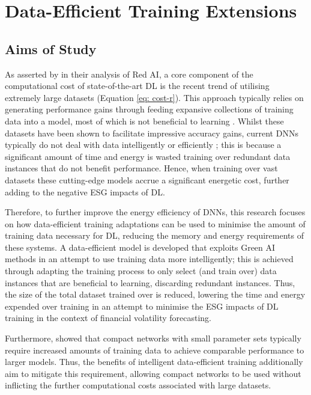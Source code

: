 \documentclass[a4paper, 11pt]{report}
\begin{document}
    \section{Data-Efficient Training Extensions}
    \label{section: data-extensions}

    \subsection{Aims of Study}

    As asserted by \citet{schwartz-2019} in their analysis of Red AI, a core component of the computational cost of state-of-the-art DL is the recent trend of utilising extremely large datasets (Equation \ref{eq: cost-r}). This approach typically relies on generating performance gains through feeding expansive collections of training data into a model, most of which is not beneficial to learning \citep{bender-2021}. Whilst these datasets have been shown to facilitate impressive accuracy gains, current DNNs typically do not deal with data intelligently or efficiently \citep{aljarrah-2015}; this is because a significant amount of time and energy is wasted training over redundant data instances that do not benefit performance. Hence, when training over vast datasets these cutting-edge models accrue a significant energetic cost, further adding to the negative ESG impacts of DL. 

    Therefore, to further improve the energy efficiency of DNNs, this research focuses on how data-efficient training adaptations can be used to minimise the amount of training data necessary for DL, reducing the memory and energy requirements of these systems. A data-efficient model is developed that exploits Green AI methods in an attempt to use training data more intelligently; this is achieved through adapting the training process to only select (and train over) data instances that are beneficial to learning, discarding redundant instances. Thus, the size of the total dataset trained over is reduced, lowering the time and energy expended over training in an attempt to minimise the ESG impacts of DL training in the context of financial volatility forecasting. 

    Furthermore, \citet{bender-2021} showed that compact networks with small parameter sets typically require increased amounts of training data to achieve comparable performance to larger models. Thus, the benefits of intelligent data-efficient training additionally aim to mitigate this requirement, allowing compact networks to be used without inflicting the further computational costs associated with large datasets.
\end{document}
